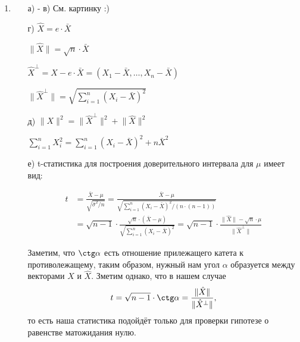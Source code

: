\begin{enumerate}
\item
\begin{enumerate}
	\item[а) - в)] См. картинку :)
\begin{figure}[h!]
\centering
{}
\end{figure}
\item[г)] $\hat{X}=e\cdot\bar{X}$

$\lVert \hat{X} \rVert=\sqrt{n}\cdot\bar{X}$

$\hat{X}^{\perp}=X-e\cdot\bar{X}=(X_1-\bar{X}, \dots ,X_n-\bar{X})$

$\lVert\hat{X}^{\perp} \rVert =\sqrt{\sum^n_{i=1}(X_i-\bar{X})^2}$

\item[д)] $ \lVert X \rVert^2=\lVert\hat{X}^{\perp}\rVert^2+\lVert\hat{X}\rVert^2$

$\sum^n_{i=1}X^2_i=\sum^n_{i=1}(X_i-\bar{X})^2+n\bar{X}^2$

\item[е)] t-статистика для построения доверительного интервала для $\mu$ имеет вид:

\begin{align*}
t &= \frac{\bar{X}-\mu}{\sqrt{\bar{\sigma}^2/n}} = \frac{\bar{X}-\mu}{\sqrt{\sum^n_{i=1}(X_i-\bar{X})^2/(n\cdot(n-1))}}\\
& =\sqrt{n-1}\cdot\frac{\sqrt{n}\cdot(\bar{X}-\mu)}{\sqrt{\sum^n_{i=1}(X_i-\bar{X})^2}}=\sqrt{n-1}\cdot\frac{\lVert \hat{X} \rVert-\sqrt{n}\cdot\mu}{\lVert\hat{X}^{\perp} \rVert}
\end{align*}

Заметим, что $\ctg \alpha$ есть отношение прилежащего катета к противолежащему, таким образом, нужный нам угол $\alpha$ образуется между векторами $X$ и $\hat{X}$. Зметим однако, что в нашем случае
\[
t=\sqrt{n-1}\cdot \ctg \alpha=\frac{\lVert\hat{X}\rVert}{\lVert\hat{X}^{\perp}\rVert},
\]
то есть наша статистика подойдёт только для проверки гипотезе о равенстве матожидания нулю.


\end{enumerate}
\end{enumerate}

